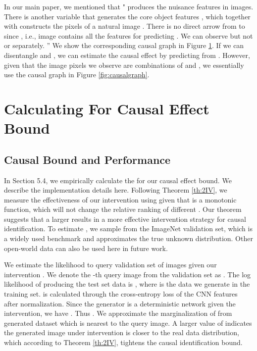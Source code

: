 \documentclass[final]{cvpr}
\begin{document}
\begin{subappendices}
\begin{figure}[t]
  \label{fig:disentangled-graph}
\end{figure}


In our main paper, we mentioned that " produces the nuisance features  in images. There is another variable  that generates the core object features , which together with  constructs the pixels of a natural image . There is no direct arrow from  to  since , i.e., image  contains all the features for predicting . We can observe  but not  or  separately. '' We show the corresponding causal graph in Figure \ref{fig:disentangled-graph}. If we can disentangle  and , we can estimate the causal effect by predicting  from . However, given that the image pixels we observe are combinations of  and , we essentially use the causal graph in Figure \ref{fig:causalgraph}. 
\section{Calculating  For Causal Effect Bound}


\subsection{Causal Bound and Performance}
In Section 5.4, we empirically calculate the  for our causal effect bound. We describe the implementation details here.
Following Theorem \ref{th:2IV}, we measure the effectiveness of our intervention using  given that  is a monotonic function, which will not change the relative ranking of different . Our theorem suggests that a larger  results in a more effective intervention strategy for causal identification. To estimate , we sample  from the ImageNet validation set, which is a widely used benchmark and approximates the true unknown distribution. Other open-world data can also be used here in future work. 

We estimate the likelihood to query validation set of images  given our intervention .  We denote the -th query image from the validation set as . The log likelihood of producing the test set data is , where  is the data we generate in the training set.  is calculated through the cross-entropy loss of the CNN features after  normalization. Since the generator is a deterministic network given the intervention, we have . Thus .  We approximate the marginalization of  from generated dataset which is nearest to the query image. A larger value of  indicates the generated image under intervention  is closer to the real data distribution, which according to Theorem \ref{th:2IV}, tightens the causal identification bound. 



\end{subappendices}
\end{document}
